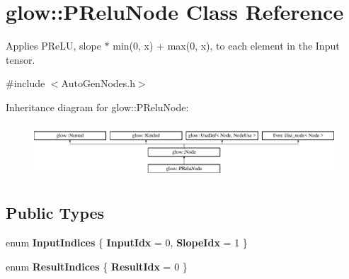 \hypertarget{classglow_1_1_p_relu_node}{}\section{glow\+:\+:P\+Relu\+Node Class Reference}
\label{classglow_1_1_p_relu_node}


Applies P\+Re\+LU, slope $\ast$ min(0, x) + max(0, x), to each element in the Input tensor.  




{\ttfamily \#include $<$Auto\+Gen\+Nodes.\+h$>$}

Inheritance diagram for glow\+:\+:P\+Relu\+Node\+:\begin{figure}[H]
\begin{center}
\leavevmode
\includegraphics[height=2.028986cm]{classglow_1_1_p_relu_node}
\end{center}
\end{figure}
\subsection*{Public Types}
\begin{DoxyCompactItemize}
\item 
\mbox{\label{classglow_1_1_p_relu_node_ac81f88702df3d41df34cc29ed26d187f}} 
enum {\bfseries Input\+Indices} \{ {\bfseries Input\+Idx} = 0, 
{\bfseries Slope\+Idx} = 1
 \}
\item 
\mbox{\label{classglow_1_1_p_relu_node_a336d41d90e71da79dc85046372e5aadc}} 
enum {\bfseries Result\+Indices} \{ {\bfseries Result\+Idx} = 0
 \}
\end{DoxyCompactItemize}
